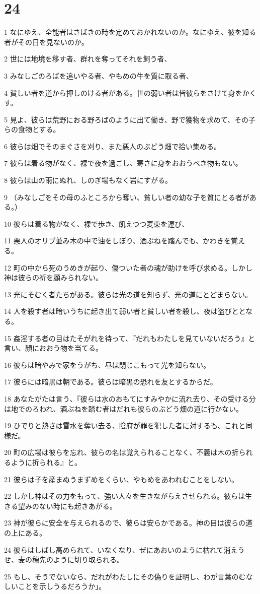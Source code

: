 \chapter{24}

\par 1 なにゆえ、全能者はさばきの時を定めておかれないのか。なにゆえ、彼を知る者がその日を見ないのか。
\par 2 世には地境を移す者、群れを奪ってそれを飼う者、
\par 3 みなしごのろばを追いやる者、やもめの牛を質に取る者、
\par 4 貧しい者を道から押しのける者がある。世の弱い者は皆彼らをさけて身をかくす。
\par 5 見よ、彼らは荒野におる野ろばのように出て働き、野で獲物を求めて、その子らの食物とする。
\par 6 彼らは畑でそのまぐさを刈り、また悪人のぶどう畑で拾い集める。
\par 7 彼らは着る物がなく、裸で夜を過ごし、寒さに身をおおうべき物もない。
\par 8 彼らは山の雨にぬれ、しのぎ場もなく岩にすがる。
\par 9 （みなしごをその母のふところから奪い、貧しい者の幼な子を質にとる者がある。）
\par 10 彼らは着る物がなく、裸で歩き、飢えつつ麦束を運び、
\par 11 悪人のオリブ並み木の中で油をしぼり、酒ぶねを踏んでも、かわきを覚える。
\par 12 町の中から死のうめきが起り、傷ついた者の魂が助けを呼び求める。しかし神は彼らの祈を顧みられない。
\par 13 光にそむく者たちがある。彼らは光の道を知らず、光の道にとどまらない。
\par 14 人を殺す者は暗いうちに起き出て弱い者と貧しい者を殺し、夜は盗びととなる。
\par 15 姦淫する者の目はたそがれを待って、『だれもわたしを見ていないだろう』と言い、顔におおう物を当てる。
\par 16 彼らは暗やみで家をうがち、昼は閉じこもって光を知らない。
\par 17 彼らには暗黒は朝である。彼らは暗黒の恐れを友とするからだ。
\par 18 あなたがたは言う、『彼らは水のおもてにすみやかに流れ去り、その受ける分は地でのろわれ、酒ぶねを踏む者はだれも彼らのぶどう畑の道に行かない。
\par 19 ひでりと熱さは雪水を奪い去る、陰府が罪を犯した者に対するも、これと同様だ。
\par 20 町の広場は彼らを忘れ、彼らの名は覚えられることなく、不義は木の折られるように折られる』と。
\par 21 彼らは子を産まぬうまずめをくらい、やもめをあわれむことをしない。
\par 22 しかし神はその力をもって、強い人々を生きながらえさせられる。彼らは生きる望みのない時にも起きあがる。
\par 23 神が彼らに安全を与えられるので、彼らは安らかである。神の目は彼らの道の上にある。
\par 24 彼らはしばし高められて、いなくなり、ぜにあおいのように枯れて消えうせ、麦の穂先のように切り取られる。
\par 25 もし、そうでないなら、だれがわたしにその偽りを証明し、わが言葉のむなしいことを示しうるだろうか」。

